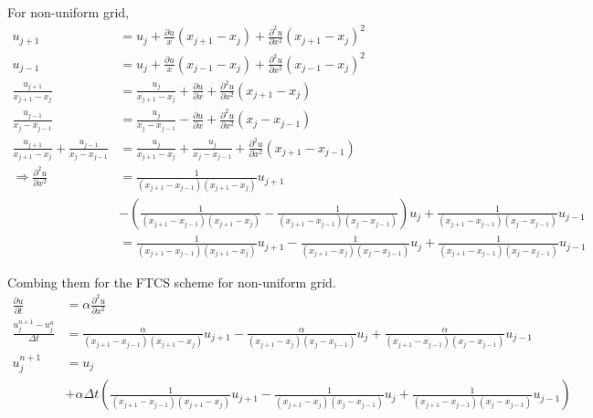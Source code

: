 \documentclass[letterpaper,10pt]{article}
\begin{document}
For non-uniform grid, 
\begin{align*}
  u_{j+1}&=u_j + \frac{\partial u}{x}(x_{j+1}-x_j)+\frac{\partial^2 u}{\partial x^2}(x_{j+1}-x_j)^2\\
  u_{j-1}&=u_j + \frac{\partial u}{x}(x_{j-1}-x_j)+\frac{\partial^2 u}{\partial x^2}(x_{j-1}-x_j)^2\\
  \frac{u_{j+1}}{x_{j+1}-x_j}&=\frac{u_j}{x_{j+1}-x_j}+\frac{\partial u}{\partial x}+\frac{\partial^2 u}{\partial x^2}(x_{j+1}-x_j)\\
  \frac{u_{j-1}}{x_j-x_{j-1}}&=\frac{u_j}{x_j-x_{j-1}}-\frac{\partial u}{\partial x}+\frac{\partial^2 u}{\partial x^2}(x_j-x_{j-1})\\
  \frac{u_{j+1}}{x_{j+1}-x_j}+\frac{u_{j-1}}{x_j-x_{j-1}}&=\frac{u_j}{x_{j+1}-x_j}+\frac{u_j}{x_j-x_{j-1}}+\frac{\partial^2 u}{\partial x^2}(x_{j+1}-x_{j-1})\\
  \Rightarrow \frac{\partial^2 u}{\partial x^2}&=\frac{1}{(x_{j+1}-x_{j-1})(x_{j+1}-x_j)}u_{j+1}\\
  &-\left(\frac{1}{(x_{j+1}-x_{j-1})(x_{j+1}-x_j)}-\frac{1}{(x_{j+1}-x_{j-1})(x_j-x_{j-1})}\right)u_j+\frac{1}{(x_{j+1}-x_{j-1})(x_j-x_{j-1})}u_{j-1}\\
  &=\frac{1}{(x_{j+1}-x_{j-1})(x_{j+1}-x_j)}u_{j+1}-\frac{1}{(x_{j+1}-x_{j})(x_j-x_{j-1})}u_j+\frac{1}{(x_{j+1}-x_{j-1})(x_j-x_{j-1})}u_{j-1}
\end{align*}

Combing them for the FTCS scheme for non-uniform grid. 
\begin{align*}
  \frac{\partial u}{\partial t}&=\alpha\frac{\partial^2 u}{\partial x^2}\\
  \frac{u_j^{n+1}-u_j^n}{\Delta t}&=\frac{\alpha}{(x_{j+1}-x_{j-1})(x_{j+1}-x_j)}u_{j+1}-\frac{\alpha}{(x_{j+1}-x_{j})(x_j-x_{j-1})}u_j+\frac{\alpha}{(x_{j+1}-x_{j-1})(x_j-x_{j-1})}u_{j-1}\\
  u_j^{n+1}&=u_j\\
  &+\alpha \Delta t\left(\frac{1}{(x_{j+1}-x_{j-1})(x_{j+1}-x_j)}u_{j+1}-\frac{1}{(x_{j+1}-x_{j})(x_j-x_{j-1})}u_j+\frac{1}{(x_{j+1}-x_{j-1})(x_j-x_{j-1})}u_{j-1}\right)
\end{align*}
\end{document}
